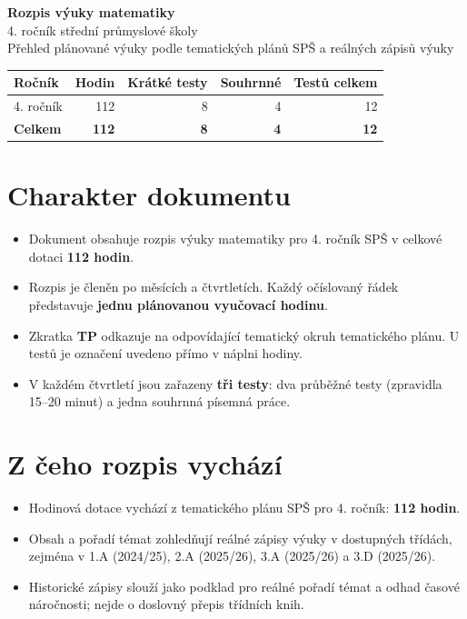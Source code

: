 \documentclass[10pt,a4paper]{article}
\begin{document}
\begin{center}
{\LARGE\bfseries Rozpis výuky matematiky}\\[3mm]
{\large 4. ročník střední průmyslové školy}\\[3mm]
{\small Přehled plánované výuky podle tematických plánů SP\v{S} a reálných zápisů výuky}
\end{center}
\vspace{3mm}
\begin{tabularx}{\textwidth}{@{}Xrrrr@{}}\toprule
\textbf{Ročník} & \textbf{Hodin} & \textbf{Krátké testy} & \textbf{Souhrnné} & \textbf{Testů celkem}\\\midrule
4. ročník & 112 & 8 & 4 & 12\\\midrule
\textbf{Celkem} & \textbf{112} & \textbf{8} & \textbf{4} & \textbf{12}\\\bottomrule
\end{tabularx}
\vspace{4mm}
\section*{Charakter dokumentu}
\begin{itemize}\setlength{\itemsep}{2pt}
\item Dokument obsahuje rozpis výuky matematiky pro 4. ročník SP\v{S} v celkové dotaci \textbf{112 hodin}.
\item Rozpis je členěn po měsících a čtvrtletích. Každý očíslovaný řádek představuje \textbf{jednu plánovanou vyučovací hodinu}.
\item Zkratka \textbf{TP} odkazuje na odpovídající tematický okruh tematického plánu. U testů je označení uvedeno přímo v náplni hodiny.
\item V každém čtvrtletí jsou zařazeny \textbf{tři testy}: dva průběžné testy (zpravidla 15--20 minut) a jedna souhrnná písemná práce.
\end{itemize}

\section*{Z čeho rozpis vychází}
\begin{itemize}\setlength{\itemsep}{2pt}
\item Hodinová dotace vychází z tematického plánu SP\v{S} pro 4. ročník: \textbf{112 hodin}.
\item Obsah a pořadí témat zohledňují reálné zápisy výuky v dostupných třídách, zejména v 1.A (2024/25), 2.A (2025/26), 3.A (2025/26) a 3.D (2025/26).
\item Historické zápisy slouží jako podklad pro reálné pořadí témat a odhad časové náročnosti; nejde o doslovný přepis třídních knih.
\end{itemize}
\end{document}
